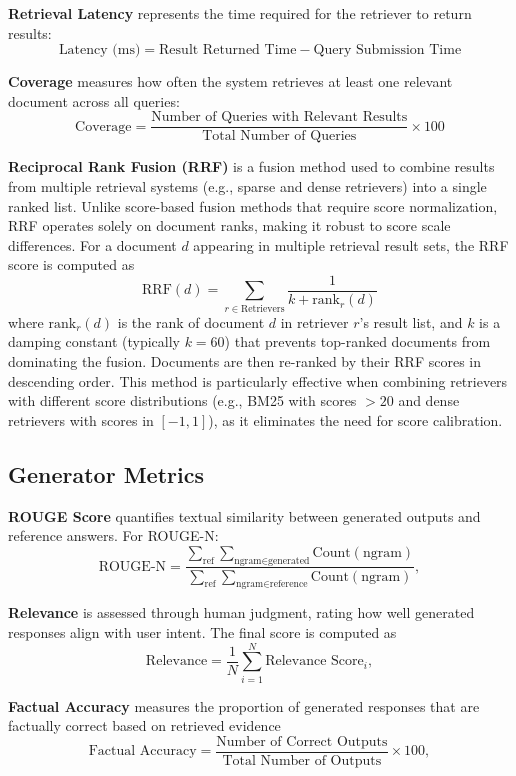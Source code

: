 \textbf{Retrieval Latency} represents the time required for the retriever to return results:
\[
\text{Latency (ms)} = \text{Result Returned Time} - \text{Query Submission Time}
\]

\textbf{Coverage} measures how often the system retrieves at least one relevant document across all queries:
\[
\text{Coverage} =
\frac{\text{Number of Queries with Relevant Results}}
{\text{Total Number of Queries}} \times 100
\]

\textbf{Reciprocal Rank Fusion (RRF)} is a fusion method used to combine results from multiple retrieval systems (e.g., sparse and dense retrievers) into a single ranked list. Unlike score-based fusion methods that require score normalization, RRF operates solely on document ranks, making it robust to score scale differences. For a document $d$ appearing in multiple retrieval result sets, the RRF score is computed as
\[
\text{RRF}(d) = \sum_{r \in \text{Retrievers}} \frac{1}{k + \text{rank}_r(d)}
\]
where $\text{rank}_r(d)$ is the rank of document $d$ in retriever $r$'s result list, and $k$ is a damping constant (typically $k=60$) that prevents top-ranked documents from dominating the fusion. Documents are then re-ranked by their RRF scores in descending order. This method is particularly effective when combining retrievers with different score distributions (e.g., BM25 with scores $>20$ and dense retrievers with scores in $[-1, 1]$), as it eliminates the need for score calibration.

\subsection{Generator Metrics}

\textbf{ROUGE Score} quantifies textual similarity between generated outputs and reference answers. For ROUGE-N:
\[
\text{ROUGE-N} =
\dfrac{
\sum_{\text{ref}} \sum_{\text{ngram} \in \text{generated}} \text{Count}(\text{ngram})
}{
\sum_{\text{ref}} \sum_{\text{ngram} \in \text{reference}} \text{Count}(\text{ngram})
},
\]

\textbf{Relevance} is assessed through human judgment, rating how well generated responses align with user intent. The final score is computed as
\[
\text{Relevance} =
\frac{1}{N} \sum_{i=1}^{N} \text{Relevance Score}_i,
\]

\textbf{Factual Accuracy} measures the proportion of generated responses that are factually correct based on retrieved evidence
\[
\text{Factual Accuracy} =
\dfrac{\text{Number of Correct Outputs}}
{\text{Total Number of Outputs}} \times 100,
\]

